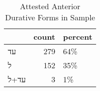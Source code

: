 \begin{table}[htbp!]
\centering
\caption{Attested Anterior Durative Forms in Sample}
\label{table:antdur_front}
\begin{tabular}{lrl}
\toprule
{} &  count & percent \\
\midrule
\texthebrew{עד}   &    279 &     64\% \\
\texthebrew{ל}    &    152 &     35\% \\
\texthebrew{עד+ל} &      3 &      1\% \\
\bottomrule
\end{tabular}
\end{table}
